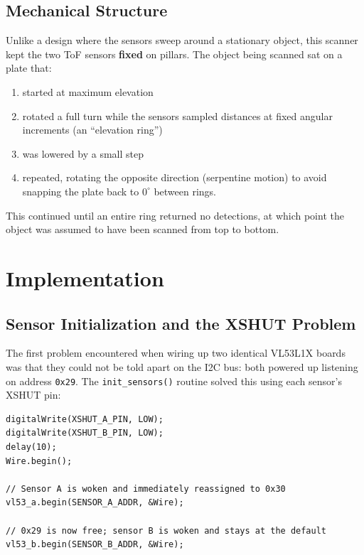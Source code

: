 \documentclass[11pt]{article}
\begin{document}
\subsection{Mechanical Structure}

Unlike a design where the sensors sweep around a stationary object, this
scanner kept the two ToF sensors \textbf{fixed} on pillars. The object
being scanned sat on a plate that:
\begin{enumerate}
  \item started at maximum elevation
  \item rotated a full turn while the sensors sampled distances at fixed
    angular increments (an ``elevation ring'')
  \item was lowered by a small step
  \item repeated, rotating the opposite direction (serpentine motion) to
    avoid snapping the plate back to $0^\circ$ between rings.
\end{enumerate}
This continued until an entire ring returned no detections, at which point
the object was assumed to have been scanned from top to bottom.

\section{Implementation}

\subsection{Sensor Initialization and the XSHUT Problem}
\label{sec:xshut}

The first problem encountered when wiring up two identical VL53L1X boards
was that they could not be told apart on the I2C bus: both powered up listening
on address \texttt{0x29}. The \texttt{init\_sensors()} routine solved this
using each sensor's XSHUT pin:

\begin{lstlisting}[caption={Sequenced sensor bring-up (excerpt from scan.ino)}]
digitalWrite(XSHUT_A_PIN, LOW);
digitalWrite(XSHUT_B_PIN, LOW);
delay(10);
Wire.begin();

// Sensor A is woken and immediately reassigned to 0x30
vl53_a.begin(SENSOR_A_ADDR, &Wire);

// 0x29 is now free; sensor B is woken and stays at the default
vl53_b.begin(SENSOR_B_ADDR, &Wire);
\end{lstlisting}
\end{document}
